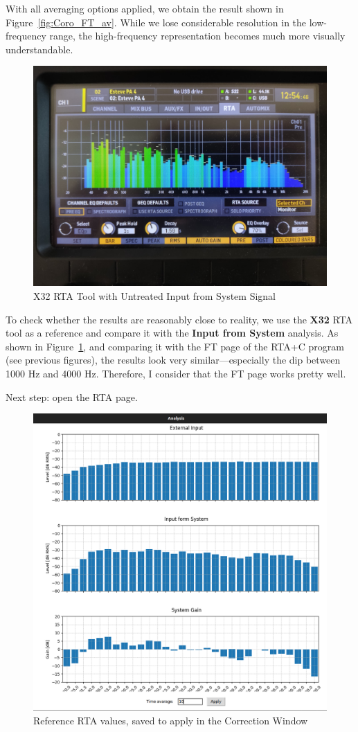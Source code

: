 With all averaging options applied, we obtain the result shown in Figure~\ref{fig:Coro_FT_av}. While we lose considerable resolution in the low-frequency range, the high-frequency representation becomes much more visually understandable.

\begin{figure}[H]
	\centering
	\includegraphics[width=0.8
	\linewidth]{Figures/Coro_X32_nontreated.jpeg}
	\caption{X32 RTA Tool with Untreated Input from System Signal}
	\label{fig:Coro_X32_nontreated}
\end{figure}

To check whether the results are reasonably close to reality, we use the \textbf{X32} RTA tool as a reference and compare it with the \textbf{Input from System} analysis. As shown in Figure~\ref{fig:Coro_X32_nontreated}, and comparing it with the FT page of the RTA+C program (see previous figures), the results look very similar—especially the dip between 1000 Hz and 4000 Hz. Therefore, I consider that the FT page works pretty well.

Next step: open the RTA page.

\begin{figure}[H]
	\centering
	\includegraphics[width=0.8
	\linewidth]{Figures/Coro_RTA_Saved.png}
	\caption{Reference RTA values, saved to apply in the Correction Window}
	\label{fig:Coro_RTA_saved}
\end{figure}

